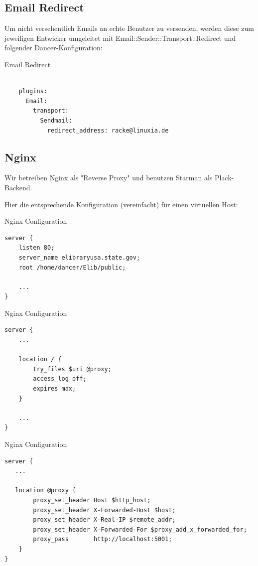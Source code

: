 \subsection{Email Redirect}

Um nicht versehentlich Emails an echte Benutzer zu versenden,
werden diese zum jeweiligen Entwicker umgeleitet mit
Email::Sender::Transport::Redirect und folgender
Dancer-Konfiguration:

\begin{frame}[fragile]{Email Redirect}
\begin{lstlisting}

    plugins:
      Email:
        transport:
          Sendmail:
            redirect_address: racke@linuxia.de

\end{lstlisting}
\end{frame}

\subsection{Nginx}
    
Wir betreiben Nginx als "Reverse Proxy" und benutzen Starman als
Plack-Backend.

Hier die entsprechende Konfiguration (vereinfacht) für einen virtuellen
Host:

\begin{frame}[fragile]{Nginx Configuration}
\begin{lstlisting}
server {
    listen 80;
    server_name elibraryusa.state.gov;
    root /home/dancer/Elib/public;

    ...
}
\end{lstlisting}
\end{frame}

\begin{frame}[fragile]{Nginx Configuration}
\begin{lstlisting}
server {
    ...

    location / {
        try_files $uri @proxy;
        access_log off;
        expires max;
    }

    ...
}
\end{lstlisting}
\end{frame}

\begin{frame}[fragile]{Nginx Configuration}
\begin{lstlisting}
server {
   ...

   location @proxy {
        proxy_set_header Host $http_host;
        proxy_set_header X-Forwarded-Host $host;
        proxy_set_header X-Real-IP $remote_addr;
        proxy_set_header X-Forwarded-For $proxy_add_x_forwarded_for;
        proxy_pass       http://localhost:5001;
    }
}
\end{lstlisting}
\end{frame}

